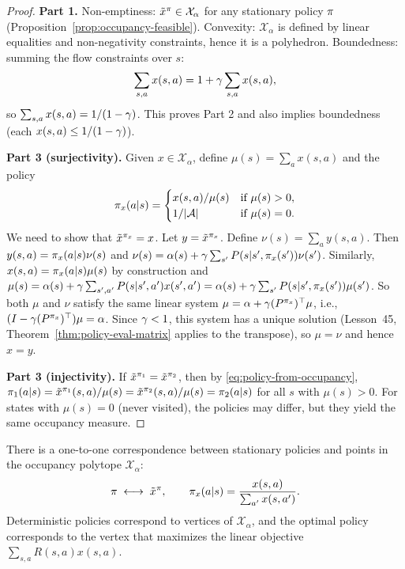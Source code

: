 \documentclass[11pt,a4paper]{article}
\begin{document}
\begin{proof}
\textbf{Part 1.} Non-emptiness: $\tilde{x}^\pi \in
\mathcal{X}_\alpha$ for any stationary policy $\pi$
(Proposition~\ref{prop:occupancy-feasible}). Convexity:
$\mathcal{X}_\alpha$ is defined by linear equalities and
non-negativity constraints, hence it is a polyhedron. Boundedness:
summing the flow constraints over $s$:
\[
    \sum_{s,a} x(s,a) = 1 + \gamma \sum_{s,a} x(s,a),
\]
so $\sum_{s,a} x(s,a) = 1/(1-\gamma)$. This proves Part 2 and
also implies boundedness (each $x(s,a) \leq 1/(1-\gamma)$).

\textbf{Part 3 (surjectivity).} Given $x \in \mathcal{X}_\alpha$,
define $\mu(s) = \sum_a x(s,a)$ and the policy
\begin{equation}
\label{eq:policy-from-occupancy}
    \pi_x(a|s) = \begin{cases}
    x(s,a) / \mu(s) & \text{if } \mu(s) > 0, \\
    1/|\mathcal{A}| & \text{if } \mu(s) = 0.
    \end{cases}
\end{equation}
We need to show that $\tilde{x}^{\pi_x} = x$. Let
$y = \tilde{x}^{\pi_x}$. Define $\nu(s) = \sum_a y(s,a)$.
Then $y(s,a) = \pi_x(a|s) \nu(s)$ and
$\nu(s) = \alpha(s) + \gamma \sum_{s'} P(s|s', \pi_x(s'))
\nu(s')$. Similarly, $x(s,a) = \pi_x(a|s) \mu(s)$ by
construction and $\mu(s) = \alpha(s) + \gamma \sum_{s',a'}
P(s|s',a') x(s',a') = \alpha(s) + \gamma \sum_{s'}
P(s|s', \pi_x(s')) \mu(s')$. So both $\mu$ and $\nu$ satisfy
the same linear system
$\mu = \alpha + \gamma (P^{\pi_x})^\top \mu$, i.e.,
$(I - \gamma (P^{\pi_x})^\top) \mu = \alpha$. Since
$\gamma < 1$, this system has a unique solution
(Lesson~45, Theorem~\ref{thm:policy-eval-matrix} applies to the
transpose), so $\mu = \nu$ and hence $x = y$.

\textbf{Part 3 (injectivity).} If $\tilde{x}^{\pi_1} =
\tilde{x}^{\pi_2}$, then by \eqref{eq:policy-from-occupancy},
$\pi_1(a|s) = \tilde{x}^{\pi_1}(s,a) / \mu(s) =
\tilde{x}^{\pi_2}(s,a) / \mu(s) = \pi_2(a|s)$ for all
$s$ with $\mu(s) > 0$. For states with $\mu(s) = 0$ (never
visited), the policies may differ, but they yield the same
occupancy measure.
\end{proof}

\begin{keyresult}[title={Policy-Occupancy Correspondence}]
\label{kr:correspondence}
There is a one-to-one correspondence between stationary policies
and points in the occupancy polytope $\mathcal{X}_\alpha$:
\[
    \pi \;\longleftrightarrow\; \tilde{x}^\pi, \qquad
    \pi_x(a|s) = \frac{x(s,a)}{\sum_{a'} x(s,a')}.
\]
Deterministic policies correspond to vertices of
$\mathcal{X}_\alpha$, and the optimal policy corresponds to the
vertex that maximizes the linear objective
$\sum_{s,a} R(s,a) x(s,a)$.
\end{keyresult}
\end{document}
